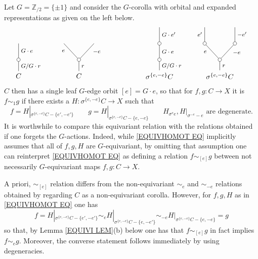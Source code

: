 \documentclass[a4paper,10pt
,draft
]{article}%
\renewcommand{\1}{\eta}%
\begin{document}
\begin{example}\label{EQUIVSIM EX}
	Let $G = \mathbb{Z}_{/2} = \{\pm 1\}$
	and consider the $G$-corolla with orbital and expanded representations as given on the left below.
\[
\begin{tikzpicture}
[grow=up,auto,level distance=2.3em,every node/.style = {font=\footnotesize},dummy/.style={circle,draw,inner sep=0pt,minimum size=1.75mm}]
	\node at (0,0) [font=\normalsize]{$C$}
		child{node [dummy] {}
			child{
			edge from parent node [swap] {$G \cdot e$}
node [name=Kone,swap] {}}
		edge from parent node [swap] {$G/G \cdot r$}
		};
	\node at (3,0) [font=\normalsize]{$C$}
		child{node [dummy] {}
			child{
			edge from parent node [swap,near end] {$-e$} node [name=Kn] {}}
			child{
			edge from parent node [near end] {$e$}
node [name=Kone,swap] {}}
		edge from parent node [swap] {$r$}
		};
	\node at (7,0) [font=\normalsize]{$\sigma^{\{e,-e\}} C$}
		child{node [dummy] {}
			child{node [dummy] {}
				child{
				edge from parent node [swap] {$G \cdot e'$}
node [swap] {}}
			edge from parent node [swap] {$G \cdot e$}
node [swap] {}}
		edge from parent node [swap] {$G/G \cdot r$}
		};
	\node at (10,0) [font=\normalsize]{$\sigma^{\{e,-e\}} C$}
		child{node [dummy] {}
			child{node [dummy] {}
				child{
				edge from parent node [swap] {$-e'$} node {}}
			edge from parent node [swap,near end] {$-e$} node {}}
			child{node [dummy] {}
				child{
				edge from parent node {$e'$}
node [swap] {}}
			edge from parent node [near end] {$e$}
node [swap] {}}
		edge from parent node [swap] {$r$}
		};
\end{tikzpicture}
\]
$C$ then has a single leaf $G$-edge orbit $[e] = G \cdot e$, so that for
$f,g \colon C \to X$ it is
$f \sim_1 g$
if there exists a 
$H \colon \sigma^{\{e,-e\}}C \to X$
such that 
\begin{equation}\label{EQUIVHOMOT EQ}
	f = H|_{\sigma^{\{e,-e\}}C - \{e',-e'\}}
\qquad
	g = H|_{\sigma^{\{e,-e\}}C - \{e,-e\}}
\qquad
	H_{\sigma^e e}, H|_{\sigma^{-e}-e} \text{ are degenerate}.
\end{equation}
It is worthwhile to compare this equivariant relation with the relations obtained if one forgets the $G$-actions. Indeed, while \eqref{EQUIVHOMOT EQ} implicitly assumes that all of $f,g,H$ are $G$-equivariant,
by omitting that assumption one can reinterpret 
\eqref{EQUIVHOMOT EQ}
as defining a relation
$f \sim_{[e]} g$ between not necessarily $G$-equivariant maps $f,g \colon C \to X$.

A priori, $\sim_{[e]}$ relation differs from the 
non-equivariant 
$\sim_{e}$ and $\sim_{-e}$
relations obtained by regarding $C$ as a non-equivariant corolla.
However, for $f,g,H$ as in \eqref{EQUIVHOMOT EQ} one has
\begin{equation}\label{EQUIVSIM EQ}
f = H|_{\sigma^{\{e,-e\}}C - \{e',-e'\}}
\sim_e H|_{\sigma^{\{e,-e\}}C - \{e,-e'\}}
\sim_{-e} H|_{\sigma^{\{e,-e\}}C - \{e,-e\}} =g
\end{equation}
so that, by Lemma \ref{EQUIVI LEM}(b) below one has that
$f \sim_{[e]} g$ in fact implies
$f \sim_{e} g$. Moreover, the converse statement follows immediately by using degeneracies.


\end{example}
\end{document}
